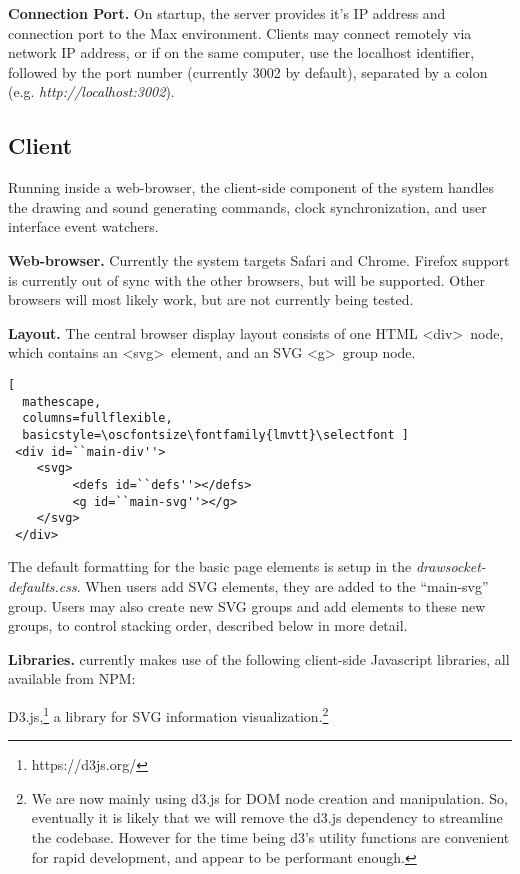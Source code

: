\medskip
\noindent
\textbf{Connection Port.} 
On startup, the server provides it's IP address and connection port to the Max environment.
Clients may connect remotely via network IP address, or if on the same computer, use the localhost identifier, followed by the port number (currently 3002 by default), separated by a colon (e.g. \textit{http://localhost:3002}).
 
 \subsection{Client}  
Running inside a web-browser, the client-side component of the \drawsocket system handles the drawing and sound generating commands, clock synchronization, and user interface event watchers.

\medskip
\noindent
\textbf{Web-browser.}  
Currently the system targets Safari and Chrome. 
Firefox support is currently out of sync with the other browsers, but will be supported. Other browsers will most likely work, but are not currently being tested.

\medskip
\noindent
\textbf{Layout.}
The central browser display layout consists of one HTML \textless div\textgreater\ node, which contains an \textless svg\textgreater\ element, and an SVG \textless g\textgreater\ group node. 

\begin{lstlisting}[
  mathescape,
  columns=fullflexible,
  basicstyle=\oscfontsize\fontfamily{lmvtt}\selectfont ]
 <div id=``main-div''>
    <svg>
         <defs id=``defs''></defs>
         <g id=``main-svg''></g>
    </svg>
 </div>
\end{lstlisting}

The default formatting for the basic page elements is setup in the \textit{drawsocket-defaults.css}.
When users add SVG elements, they are added to the ``main-svg'' group.
Users may also create new SVG groups and add elements to these new groups, to control stacking order, described below in more detail.

\medskip
\noindent
\textbf{Libraries.}
\drawsocket currently makes use of the following client-side Javascript libraries, all available from NPM:

{D3.js},\footnote{https://d3js.org/} a library for SVG information visualization.\footnote{We are now mainly using d3.js for DOM node creation and manipulation. So, eventually it is likely that we will remove the d3.js dependency to streamline the codebase. However for the time being d3's utility functions are convenient for rapid development, and appear to be performant enough.}

